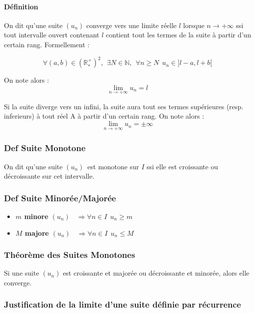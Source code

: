 \documentclass{report}
\newcommand{\un}{$(u_n)$~}
\begin{document}
    \paragraph{Définition}
    On dit qu'une suite $(u_n)$ converge vers une limite réelle $l$ lorsque $n \to +\infty$ ssi tout intervalle ouvert contenant $l$ contient tout les termes de la suite à partir d'un certain rang. Formellement : 

    \[\forall (a,b)\in(\mathbb{R}_*^+)^2, ~~ \exists N\in\mathbb{N}, ~~\forall n \geq N ~~ u_n \in ]l-a,l+b[\]

    On note alors :
    \[
    \lim_{n \to +\infty} u_n = l
    \]

    Si la suite diverge vers un infini, la suite aura tout ses termes supérieures (resp. inferieurs) à tout réel A à partir d'un certain rang. On note alors :
    \[
    \lim_{n \to +\infty} u_n = \pm \infty
    \]

    \subsubsection{Def Suite Monotone}

    On dit qu'une suite \un est monotone sur $I$ ssi elle est croissante ou décroissante sur cet intervalle.

    \subsubsection{Def Suite Minorée/Majorée}

    \begin{itemize}
      \item \textbf{$m$ minore \un} $\Rightarrow \forall n \in I ~~ u_n \geq m$
      \item \textbf{$M$ majore \un} $\Rightarrow \forall n \in I ~~ u_n \le M$
    \end{itemize}

    \subsubsection{Théorème des Suites Monotones}

    Si une suite $(u_n)$ est croissante et majorée ou décroissante et minorée, alors elle converge.

    \subsubsection{Justification de la limite d'une suite définie par récurrence}
\end{document}
